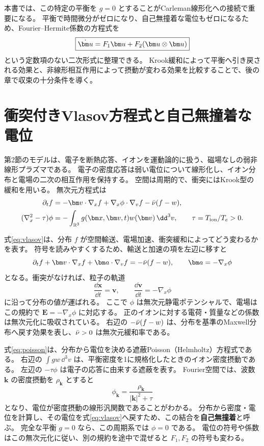 本書では、この特定の平衡を $g=0$ とすることがCarleman線形化への接続で重要になる。
平衡で時間微分がゼロになり、自己無撞着な電位もゼロになるため、Fourier--Hermite係数の方程式を
\[
\boxed{\dot\uu=F_1\uu+F_2(\uu\otimes\uu)}
\]
という定数項のない二次形式に整理できる。
Krook緩和によって平衡へ引き戻される効果と、非線形相互作用によって摂動が変わる効果を比較することで、後の章で収束の十分条件を導く。

\section{衝突付きVlasov方程式と自己無撞着な電位}
 第2節のモデルは、電子を断熱応答、イオンを運動論的に扱う、磁場なしの弱非線形プラズマである。
電子の密度応答は弱い電位について線形化し、イオン分布と電場の二次の相互作用を保持する。
空間は周期的で、衝突にはKrook型の緩和を用いる。
無次元方程式は
\begin{align}
\partial_t f&=-\bm v\cdot\nabla_x f
 +\nabla_x\phi\cdot\nabla_v f-\nuu(f-w),\label{eq:vlasov}\\
(\nabla_x^2-\tau)\phi&=-\int_{\mathbb R^3}g(\bm x,\bm v,t)w(\bm v)\,\dd^3v,
\qquad \tau=T_{\mathrm{ion}}/T_e>0.\label{eq:poisson}
\end{align}

式\eqref{eq:vlasov}は、分布 $f$ が空間輸送、電場加速、衝突緩和によってどう変わるかを表す。
符号を読みやすくするため、輸送と加速の項を左辺に移すと
\[
\partial_t f+\bm v\cdot\nabla_x f
+\bm a\cdot\nabla_v f=-\nuu(f-w),\qquad
\bm a=-\nabla_x\phi
\]
となる。衝突がなければ、粒子の軌道
\[
\frac{\dd\bm x}{\dd t}=\bm v,\qquad
\frac{\dd\bm v}{\dd t}=-\nabla_x\phi
\]
に沿って分布の値が運ばれる。
ここで $\phi$ は無次元静電ポテンシャルで、電場はこの規約で $\bm E=-\nabla_x\phi$ に対応する。
正のイオンに対する電荷・質量などの係数は無次元化に吸収されている。
右辺の $-\bar\nu(f-w)$ は、分布を基準のMaxwell分布へ戻す効果を表し、$\bar\nu>0$ は無次元緩和率である。

式\eqref{eq:poisson}は、分布から電位を決める遮蔽Poisson（Helmholtz）方程式である。
右辺の $\int gw\,\dd^3v$ は、平衡密度を1に規格化したときのイオン密度摂動である。
左辺の $-\tau\phi$ は電子の応答に由来する遮蔽を表す。
Fourier空間では、波数 $\bm k$ の密度摂動を $\rho_{\bm k}$ とすると
\[
\phi_{\bm k}=\frac{\rho_{\bm k}}{|\bm k|^2+\tau}
\]
となり、電位が密度摂動の線形汎関数であることがわかる。
分布から密度・電位を計算し、その電位を式\eqref{eq:vlasov}へ戻すため、この結合を\textbf{自己無撞着}と呼ぶ。
完全な平衡 $g=0$ なら、この周期系では $\phi=0$ である。
電位の符号や係数はこの無次元化に従い、別の規約を途中で混ぜると $F_1,F_2$ の符号も変わる。

